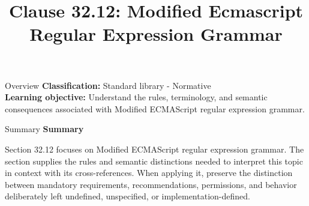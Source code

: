 \documentclass[10pt,letterpaper]{article}
\title{Clause 32.12: Modified Ecmascript Regular Expression Grammar}
\author{}
\date{}
\begin{document}
\maketitle
\begin{CornellOverviewBox}{Overview}
\textbf{Classification:} Standard library - Normative\\[2pt]
\textbf{Learning objective:} Understand the rules, terminology, and semantic consequences associated with Modified ECMAScript regular expression grammar.
\end{CornellOverviewBox}\begin{CornellSummaryBox}{Summary}
{\sffamily\bfseries\color{Accent} Summary}\par\vspace{3pt}Section 32.12 focuses on Modified ECMAScript regular expression grammar. The section supplies the rules and semantic distinctions needed to interpret this topic in context with its cross-references. When applying it, preserve the distinction between mandatory requirements, recommendations, permissions, and behavior deliberately left undefined, unspecified, or implementation-defined.
\end{CornellSummaryBox}
\end{document}
